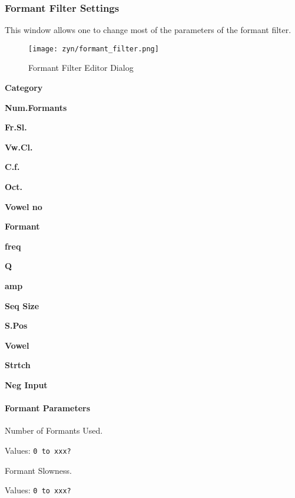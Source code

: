 \subsubsection{Formant Filter Settings}
\label{subsubsec:formant_filter_settings}

   This window allows one to change most of the parameters of the formant
   filter. 

\begin{figure}[H]
   \centering 
   \texttt{[image: zyn/formant\_filter.png]}
   \caption[Formant Filter Editor]{Formant Filter Editor Dialog}
   \label{fig:formant_filter_editor}
\end{figure}

   \begin{enumber}
      \item \textbf{Category}
      \item \textbf{Num.Formants}
      \item \textbf{Fr.Sl.}
      \item \textbf{Vw.Cl.}
      \item \textbf{C.f.}
      \item \textbf{Oct.}
      \item \textbf{Vowel no}
      \item \textbf{Formant}
      \item \textbf{freq}
      \item \textbf{Q}
      \item \textbf{amp}
      \item \textbf{Seq Size}
      \item \textbf{S.Pos}
      \item \textbf{Vowel}
      \item \textbf{Strtch}
      \item \textbf{Neg Input}
   \end{enumber}

\paragraph{Formant Parameters}
\label{paragraph:formant_parameters}

   Number of Formants Used.

   Values:  \texttt{0 to xxx?}

   Formant Slowness.

   Values:  \texttt{0 to xxx?}

